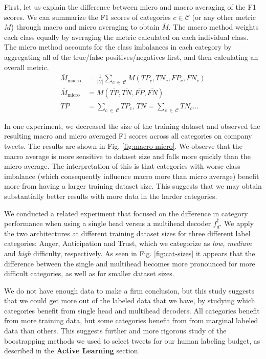 \documentclass[letterpaper]{article} %
\begin{document}
First, let us explain the difference between micro and macro averaging of the F1 scores. We can summarize the F1 scores of categories $c \in \mathcal{C}$ (or any other metric $M$) through macro and micro averaging to obtain $\overline{M}$. The macro method weights each class equally by averaging the metric calculated on each individual class. The micro method accounts for the class imbalances in each category by aggregating all of the true/false positives/negatives first, and then calculating an overall metric.
\begin{align*}
\overline{M}_{\text{macro}} &= \frac{1}{|\mathcal{C}|} \sum_{c \: \in \: \mathcal{C}} M(TP_c, TN_c, FP_c, FN_c) \\
\overline{M}_{\text{micro}} &= M(\overline{TP}, \overline{TN}, \overline{FP}, \overline{FN}) \\
\overline{TP} &= \sum_{c \: \in \: \mathcal{C}} TP_c, \,  \overline{TN} = \sum_{c \: \in \: \mathcal{C}} TN_c\ldots
\end{align*}

In one experiment, we decreased the size of the training dataset and observed the resulting macro and micro averaged F1 scores across all categories on company tweets. The results are shown in Fig. \ref{fig:macro-micro}. We observe that the macro average is more sensitive to dataset size and falls more quickly than the micro average. The interpretation of this is that categories with worse class imbalance (which consequently influence macro more than micro average) benefit more from having a larger training dataset size. This suggests that we may obtain substantially better results with more data in the harder categories.

We conducted a related experiment that focused on the difference in category performance when using a single head versus a multihead decoder $f_d^{\dagger}$. We apply the two architectures at different training dataset sizes  for three different label categories: Anger, Anticipation and Trust, which we categorize as \textit{low, medium} and \textit{high} difficulty, respectively. As seen in Fig. \ref{fig:cat-sizes} it appears that the difference between the single and multihead becomes more pronounced for more difficult categories, as well as for smaller dataset sizes.

We do not have enough data to make a firm conclusion, but this study suggests that we could get more out of the labeled data that we have, by studying which categories benefit from single head and multihead decoders. All categories benefit from more training data, but some categories benefit from from marginal labeled data than others. This suggests further and more rigorous study of the boostrapping methods we used to select tweets for our human labeling budget, as described in the \textbf{Active Learning} section.
\end{document}
